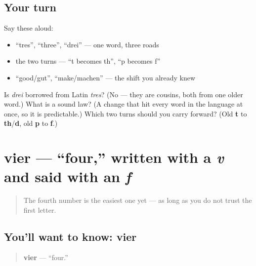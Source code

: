 \subsection*{Your turn}
Say these aloud:

\begin{itemize}
\raggedright
  \item \textquotedblleft{}tres\textquotedblright{}, \textquotedblleft{}three\textquotedblright{}, \textquotedblleft{}drei\textquotedblright{} — one word, three roads
  \item the two turns — \textquotedblleft{}t becomes th\textquotedblright{}, \textquotedblleft{}p becomes f\textquotedblright{}
  \item \textquotedblleft{}good/gut\textquotedblright{}, \textquotedblleft{}make/machen\textquotedblright{} — the shift you already knew
\end{itemize}

\begin{tcolorbox}[breakable,colback=teal!4,colframe=teal!35!black,title={Before you move on}]
Is \emph{drei} borrowed from Latin \emph{tres}? (No — they are cousins, both from one older word.) What is a sound law? (A change that hit every word in the language at once, so it is predictable.) Which two turns should you carry forward? (Old \textbf{t} to \textbf{th}/\textbf{d}, old \textbf{p} to \textbf{f}.)
\end{tcolorbox}
\section[vier]{vier — \textquotedblleft{}four,\textquotedblright{} written with a \emph{v} and said with an \emph{f}}

\label{lesson:GE-C06-vier}



\begin{quote}
The fourth number is the easiest one yet — as long as you do not trust the first letter.
\end{quote}

\subsection*{You'll want to know: vier}
\begin{quote}
\textbf{vier} — \textquotedblleft{}four.\textquotedblright{}
\end{quote}

